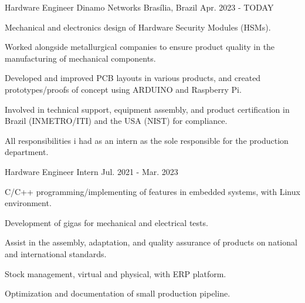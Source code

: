 

\begin{cventries}

  \cventry
    {Hardware Engineer} %
    {Dinamo Networks} %
    {Brasília, Brazil} %
    {Apr. 2023 - TODAY} %
    {
      \begin{cvitems} %
        \item {Mechanical and electronics design of Hardware Security Modules (HSMs).}
        \item {Worked alongside metallurgical companies to ensure product quality in the manufacturing of mechanical components.}
        \item {Developed and improved PCB layouts in various products, and created prototypes/proofs of concept using ARDUINO and Raspberry Pi.}
        \item {Involved in technical support, equipment assembly, and product certification in Brazil (INMETRO/ITI) and the USA (NIST) for compliance.}
        \item {All responsibilities i had as an intern as the sole responsible for the production department.}
      \end{cvitems}
    }

  \cventry
    {Hardware Engineer Intern} %
    {} %
    {} %
    {Jul. 2021 - Mar. 2023} %
    {
      \begin{cvitems} %
        \item {C/C++ programming/implementing of features in embedded systems, with Linux environment.}
        \item {Development of gigas for mechanical and electrical tests.}
        \item {Assist in the assembly, adaptation, and quality assurance of products on national and international standards.}
        \item {Stock management, virtual and physical, with ERP platform.}
        \item {Optimization and documentation of small production pipeline.}
      \end{cvitems}
    }


\end{cventries}
